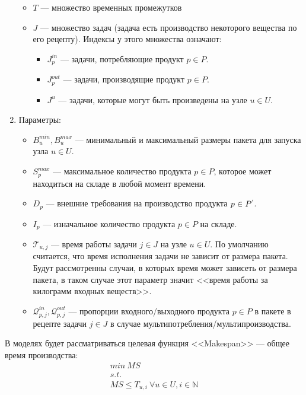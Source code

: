 \documentclass[12pt, twoside]{article}
\theoremstyle{definition}
\newcommand{\Tau}{\mathcal{T}}
\begin{document}
\begin{enumerate}
\begin{itemize}
     \item $T$ --- множество временных промежутков
     \item $J$ --- множество задач (задача есть производство некоторого вещества по его рецепту). Индексы у этого множества означают:
     \begin{itemize}
     		\item $J^{in}_p$ --- задачи, потребляющие продукт $p \in P$.
     		\item $J^{out}_p$ --- задачи, производящие продукт $p \in P$.
     		\item $J^{u}$ --- задачи, которые могут быть произведены на узле $u \in U$.
     \end{itemize}
   \end{itemize}
   \item Параметры:
   	\begin{itemize}
   		\item $B^{min}_u, B^{max}_u$ --- минимальный и максимальный размеры пакета для запуска узла $u \in U$.
   		\item $S^{max}_p$ --- максимальное количество продукта $p \in P$, которое может находиться на складе в любой момент времени.
   		\item $D_p$ --- внешние требования на производство продукта $p \in P^{`}$.
   		\item $I_p$ --- изначальное количество продукта $p \in P$ на складе.
   		\item $\Tau_{u, j}$ --- время работы задачи $j \in J$ на узле $u \in U$. По умолчанию считается, что время исполнения задачи не зависит от размера пакета. Будут рассмотренны случаи, в которых время может зависеть от размера пакета, в таком случае этот параметр значит <<время работы за килограмм входных веществ>>.
   		\item $\mathcal{Q}^{in}_{p, j}, \mathcal{Q}^{out}_{p, j}$ --- пропорции входного/выходного продукта $p \in P$ в пакете в рецепте задачи $j \in J$ в случае мультипотребления/мультипроизводства.
   	\end{itemize}
\end{enumerate}

В моделях будет рассматриваться целевая функция <<Makespan>> --- общее время производства:
\begin{equation}
\begin{gathered}
	min \: MS\\
	s.t.\\
	MS \leq T_{u, i} \: \forall u \in U, i \in \mathbb{N}
\end{gathered}
\end{equation}
\end{document}
